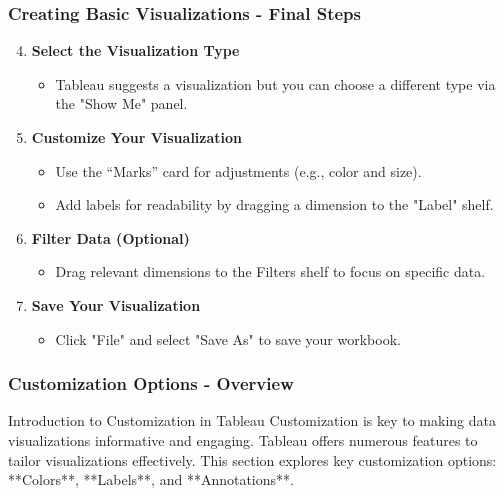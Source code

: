 \documentclass[aspectratio=169]{beamer}
\begin{document}
\begin{frame}[fragile]
    \frametitle{Creating Basic Visualizations - Final Steps}
    \begin{enumerate}
        \setcounter{enumi}{3}
        \item \textbf{Select the Visualization Type}
        \begin{itemize}
            \item Tableau suggests a visualization but you can choose a different type via the "Show Me" panel.
        \end{itemize}

        \item \textbf{Customize Your Visualization}
        \begin{itemize}
            \item Use the “Marks” card for adjustments (e.g., color and size).
            \item Add labels for readability by dragging a dimension to the "Label" shelf.
        \end{itemize}

        \item \textbf{Filter Data (Optional)}
        \begin{itemize}
            \item Drag relevant dimensions to the Filters shelf to focus on specific data.
        \end{itemize}

        \item \textbf{Save Your Visualization}
        \begin{itemize}
            \item Click "File" and select "Save As" to save your workbook.
        \end{itemize}
    \end{enumerate}
\end{frame}

\begin{frame}[fragile]
    \frametitle{Customization Options - Overview}
    \begin{block}{Introduction to Customization in Tableau}
        Customization is key to making data visualizations informative and engaging. Tableau offers numerous features to tailor visualizations effectively. 
        This section explores key customization options: **Colors**, **Labels**, and **Annotations**.
    \end{block}
\end{frame}
\end{document}
